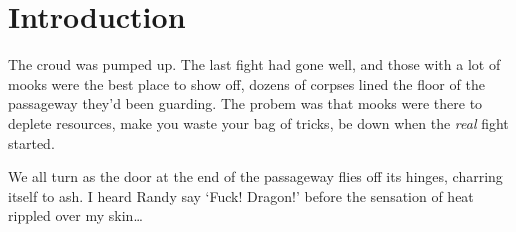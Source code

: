 \chapter{Introduction}
The croud was pumped up.
The last fight had gone well, and those with a lot of mooks were the best place to show off, dozens of corpses lined the floor of the passageway they'd been guarding.
The probem was that mooks were there to deplete resources, make you waste your bag of tricks, be down when the \emph{real} fight started.

We all turn as the door at the end of the passageway flies off its hinges, charring itself to ash.
I heard Randy say `Fuck! Dragon!' before the sensation of heat rippled over my skin\ldots
